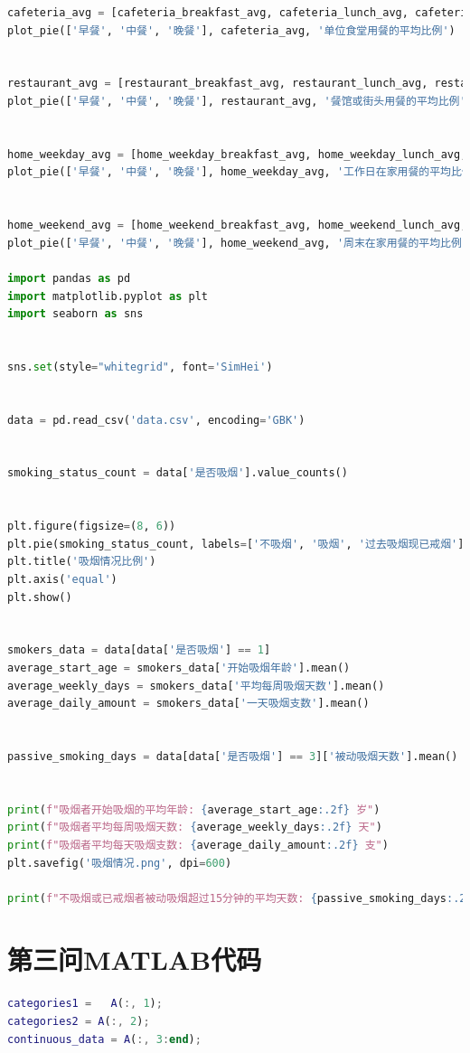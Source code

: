 \documentclass{cumcmthesis}
\begin{document}
\begin{appendices}
\begin{lstlisting}[language=python]
cafeteria_avg = [cafeteria_breakfast_avg, cafeteria_lunch_avg, cafeteria_dinner_avg]
plot_pie(['早餐', '中餐', '晚餐'], cafeteria_avg, '单位食堂用餐的平均比例')


restaurant_avg = [restaurant_breakfast_avg, restaurant_lunch_avg, restaurant_dinner_avg]
plot_pie(['早餐', '中餐', '晚餐'], restaurant_avg, '餐馆或街头用餐的平均比例')


home_weekday_avg = [home_weekday_breakfast_avg, home_weekday_lunch_avg, home_weekday_dinner_avg]
plot_pie(['早餐', '中餐', '晚餐'], home_weekday_avg, '工作日在家用餐的平均比例')


home_weekend_avg = [home_weekend_breakfast_avg, home_weekend_lunch_avg, home_weekend_dinner_avg]
plot_pie(['早餐', '中餐', '晚餐'], home_weekend_avg, '周末在家用餐的平均比例')

import pandas as pd
import matplotlib.pyplot as plt
import seaborn as sns


sns.set(style="whitegrid", font='SimHei')


data = pd.read_csv('data.csv', encoding='GBK')


smoking_status_count = data['是否吸烟'].value_counts()


plt.figure(figsize=(8, 6))
plt.pie(smoking_status_count, labels=['不吸烟', '吸烟', '过去吸烟现已戒烟'], autopct='%1.1f%%', startangle=140, colors=sns.color_palette("pastel"))
plt.title('吸烟情况比例')
plt.axis('equal')
plt.show()


smokers_data = data[data['是否吸烟'] == 1]
average_start_age = smokers_data['开始吸烟年龄'].mean()
average_weekly_days = smokers_data['平均每周吸烟天数'].mean()
average_daily_amount = smokers_data['一天吸烟支数'].mean()


passive_smoking_days = data[data['是否吸烟'] == 3]['被动吸烟天数'].mean()


print(f"吸烟者开始吸烟的平均年龄: {average_start_age:.2f} 岁")
print(f"吸烟者平均每周吸烟天数: {average_weekly_days:.2f} 天")
print(f"吸烟者平均每天吸烟支数: {average_daily_amount:.2f} 支")
plt.savefig('吸烟情况.png', dpi=600)

print(f"不吸烟或已戒烟者被动吸烟超过15分钟的平均天数: {passive_smoking_days:.2f} 天")


\end{lstlisting}
\section{第三问MATLAB代码}
\begin{lstlisting}[language=matlab]
% 提取分类变量和其他连续变量
categories1 =   A(:, 1); 
categories2 = A(:, 2);   
continuous_data = A(:, 3:end); 


\end{lstlisting}
\end{appendices}
\end{document}
